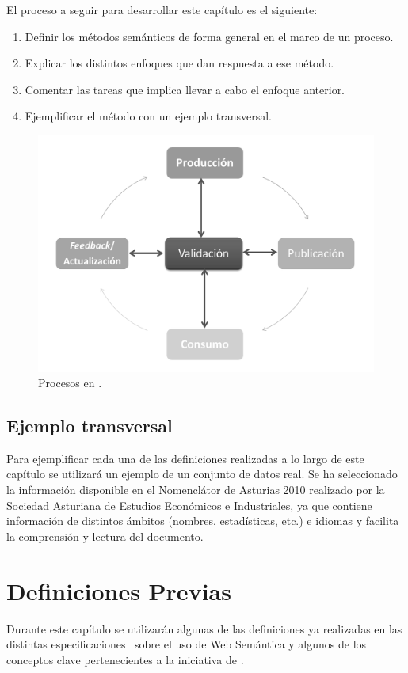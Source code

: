 El proceso a seguir para desarrollar este capítulo es el siguiente:
\begin{enumerate}
 \item Definir los métodos semánticos de forma general en el marco de un proceso.
 \item Explicar los distintos enfoques que dan respuesta a ese método.
 \item Comentar las tareas que implica llevar a cabo el enfoque anterior.
 \item Ejemplificar el método con un ejemplo transversal.
\end{enumerate}

\begin{figure}[!htb]
\centering
	\includegraphics[width=14cm]{images/phd/lld}
\caption{Procesos en \linkeddata.}
\label{fig:metodos-clasificacion-2}
\end{figure}


\subsection{Ejemplo transversal}
Para ejemplificar cada una de las definiciones realizadas a lo largo de este capítulo se utilizará
un ejemplo de un conjunto de datos real. Se ha seleccionado la información disponible en el Nomenclátor
de Asturias 2010 realizado por la Sociedad Asturiana de Estudios Económicos e Industriales, ya que contiene
información de distintos ámbitos (nombres, estadísticas, etc.) e idiomas y facilita la comprensión y lectura del documento. 

\section{Definiciones Previas}
Durante este capítulo se utilizarán algunas de las definiciones ya realizadas
en las distintas especificaciones~\cite{RDF,citeulike:1556975,RDFS,owl2-primer,SparqlSemantics,Perez:2009:SCS:1567274.1567278} sobre el uso de Web Semántica y algunos
de los conceptos clave pertenecientes a la iniciativa de \linkeddata. 

